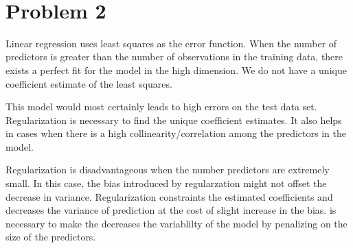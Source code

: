 \documentclass[11pt]{article}
\begin{document}
\begin{center}

\ \\
\end{center}

\section*{Problem 2}

\vspace{5 mm}
\noindent
Linear regression uses least squares as the error function. When the number of predictors is
greater than the number of observations in the training data, there exists a perfect fit for the
model in the high dimension. We do not have a unique coefficient estimate of the least squares.

This model would most certainly leads to high errors on the test data set. Regularization is necessary
to find the unique coefficient estimates. It also helps in cases when there is a high collinearity/correlation
among the predictors in the model.

Regularization is disadvantageous when the number predictors are extremely small. In this case, the bias
introduced by regularzation might not offset the decrease in variance. 
Regularization constraints the estimated coefficients and decreases the variance of prediction 
at the cost of slight increase in the bias. is necessary to make the 
decreases the variablilty of the model by penalizing on the size of the 
predictors. 


\vspace{5 mm}
\noindent
\end{document}
